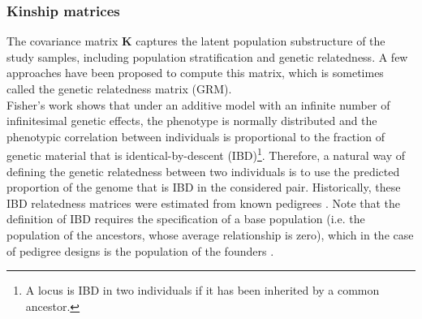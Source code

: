 




\subsubsection{Kinship matrices}
\label{sec:kinship_matrices}

The covariance matrix $\mathbf{K}$ captures the latent population substructure of the study samples, including population stratification and genetic relatedness.
A few approaches have been proposed to compute this matrix, which is sometimes called the genetic relatedness matrix (GRM).\\

Fisher’s work \cite{fisher1919xv} shows that under an additive model with an infinite number of infinitesimal genetic effects, the phenotype is normally distributed and the phenotypic correlation between individuals is proportional to the fraction of genetic material that is identical-by-descent (IBD)\footnote{A locus is IBD in two individuals if it has been inherited by a common ancestor.}. 
Therefore, a natural way of defining the genetic relatedness between two individuals is to use the predicted proportion of the genome that is IBD in the considered pair. 
Historically, these IBD relatedness matrices were estimated from known pedigrees \cite{lange1976extensions}. 
Note that the definition of IBD requires the specification of a base population (i.e. the population of the ancestors, whose average relationship is zero), which in the case of pedigree designs is the population of the founders \cite{powell2010reconciling}.\\

